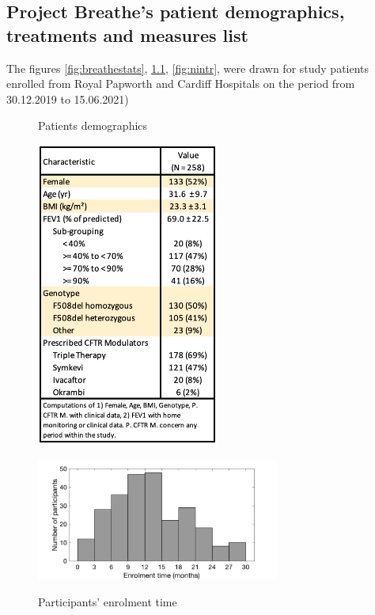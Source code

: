 \begin{appendices}

\chapter{Project Breathe's patient demographics, treatments and measures list} \label{sec:appendixbreathe}
The figures \ref{fig:breathestats}, \ref{fig:enrolmenttime}, \ref{fig:nintr}, were drawn for study patients enrolled from Royal Papworth and Cardiff Hospitals on the period from 30.12.2019 to 15.06.2021)

\begin{figure}[!htb]
   \begin{minipage}{0.48\textwidth}
     \caption{Patients demographics}
    \centering
    \includegraphics[width=60mm]{images/breathestats.png}
    \label{fig:breathestats}
   \end{minipage}\hfill
   \begin{minipage}{0.48\textwidth}
   
     \caption{Participants' enrolment time}
    \centering
    \includegraphics[width=80mm]{images/Patient_enrolment_time_from30-Dec-2019_to15-Jun-2021.png}
    \label{fig:enrolmenttime}
    

\end{minipage}
\end{figure}
\end{appendices}
